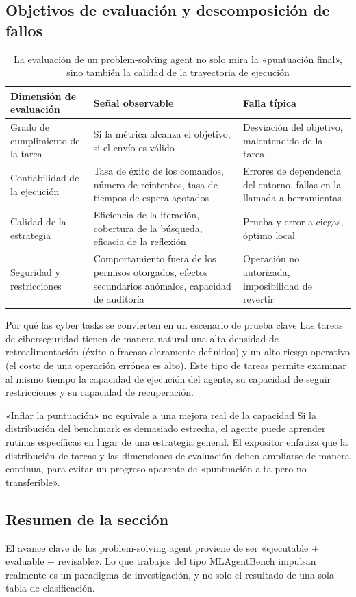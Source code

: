 \subsection{Objetivos de evaluación y descomposición de fallos}
\begin{table}[H]
\centering
\begin{tabular}{p{2.8cm}p{4.0cm}p{4.8cm}}
\toprule
\textbf{Dimensión de evaluación} & \textbf{Señal observable} & \textbf{Falla típica} \\
\midrule
Grado de cumplimiento de la tarea & Si la métrica alcanza el objetivo, si el envío es válido & Desviación del objetivo, malentendido de la tarea \\
Confiabilidad de la ejecución & Tasa de éxito de los comandos, número de reintentos, tasa de tiempos de espera agotados & Errores de dependencia del entorno, fallas en la llamada a herramientas \\
Calidad de la estrategia & Eficiencia de la iteración, cobertura de la búsqueda, eficacia de la reflexión & Prueba y error a ciegas, óptimo local \\
Seguridad y restricciones & Comportamiento fuera de los permisos otorgados, efectos secundarios anómalos, capacidad de auditoría & Operación no autorizada, imposibilidad de revertir \\
\bottomrule
\end{tabular}
\caption{La evaluación de un problem-solving agent no solo mira la «puntuación final», sino también la calidad de la trayectoria de ejecución}
\end{table}

\begin{knowledgebox}{Por qué las cyber tasks se convierten en un escenario de prueba clave}
Las tareas de ciberseguridad tienen de manera natural una alta densidad de retroalimentación (éxito o fracaso claramente definidos) y un alto riesgo operativo (el costo de una operación errónea es alto).  
Este tipo de tareas permite examinar al mismo tiempo la capacidad de ejecución del agente, su capacidad de seguir restricciones y su capacidad de recuperación.
\end{knowledgebox}

\begin{warningbox}{«Inflar la puntuación» no equivale a una mejora real de la capacidad}
Si la distribución del benchmark es demasiado estrecha, el agente puede aprender rutinas específicas en lugar de una estrategia general.  
El expositor enfatiza que la distribución de tareas y las dimensiones de evaluación deben ampliarse de manera continua, para evitar un progreso aparente de «puntuación alta pero no transferible».
\end{warningbox}

\subsection{Resumen de la sección}
El avance clave de los problem-solving agent proviene de ser «ejecutable + evaluable + revisable». Lo que trabajos del tipo MLAgentBench impulsan realmente es un paradigma de investigación, y no solo el resultado de una sola tabla de clasificación.

